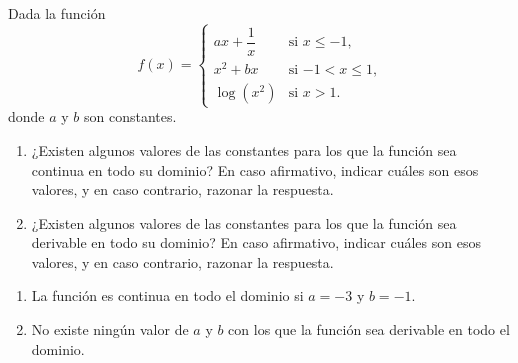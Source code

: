 {Dada la función
\[ f(x)=
\begin{cases}
ax+\dfrac{1}{x} & \mbox{si $x\leq -1$,} \\
x^2+bx & \mbox{si $-1<x\leq 1$,} \\
\log (x^2) & \mbox{si $x>1$.}
\end{cases}
\]
donde $a$ y $b$ son constantes.
\begin{enumerate}
\item  ¿Existen algunos valores de las constantes para los que la función sea continua en todo su dominio? En caso afirmativo, indicar cuáles son esos valores, y en caso contrario, razonar la respuesta.
\item  ¿Existen algunos valores de las constantes para los que la función sea derivable en todo su dominio? En caso afirmativo, indicar cuáles son esos valores, y en caso contrario, razonar la respuesta.
\end{enumerate}
}
{\begin{enumerate}
\item La función es continua en todo el dominio si $a=-3$ y $b=-1$.
\item No existe ningún valor de $a$ y $b$ con los que la función sea derivable en todo el dominio.   
\end{enumerate}
}
{
}


